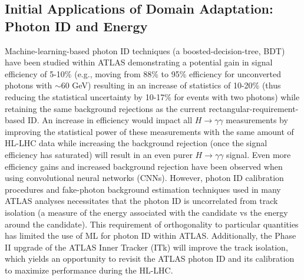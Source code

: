 \documentclass[letter, USenglish, 11pt, subfigure]{article}
\newcommand{\hyy}{\ensuremath{H(\to\gamma\gamma)}}
\begin{document}
\subsection{Initial Applications of Domain Adaptation: Photon ID and Energy}

Machine-learning-based photon ID techniques (a boosted-decision-tree, BDT) have been studied within ATLAS demonstrating a potential gain in signal efficiency of 5-10\% (e.g., moving from 88\% to 95\% efficiency for unconverted photons with \pt$\sim$60 GeV) resulting in an increase of statistics of 10-20\% (thus reducing the statistical uncertainty by 10-17\% for events with two photons) while retaining the same background rejections as the current rectangular-requirement-based ID. An increase in efficiency would impact all $H\to\gamma\gamma$ measurements by improving the statistical power of these measurements with the same amount of HL-LHC data while increasing the background rejection (once the signal efficiency has saturated) will result in an even purer $H\to\gamma\gamma$ signal. Even more efficiency gains and increased background rejection have been observed when using convolutional neural networks (CNNs). However, photon ID calibration procedures and fake-photon background estimation techniques used in many ATLAS analyses necessitates that the photon ID is uncorrelated from track isolation (a measure of the energy associated with the candidate vs the energy around the candidate). This requirement of orthogonality to particular quantities has limited the use of ML for photon ID within ATLAS. Additionally, the Phase II upgrade of the ATLAS Inner Tracker (ITk) will improve the track isolation, which yields an opportunity to revisit the ATLAS photon ID and its calibration to maximize performance during the HL-LHC. 
\end{document}
